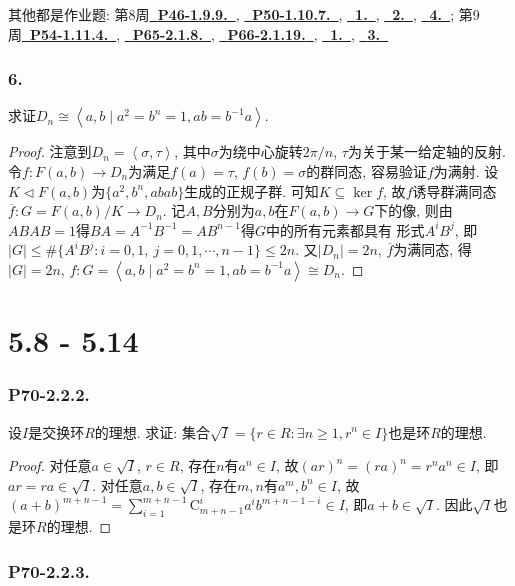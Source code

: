 \documentclass[12pt, a4paper, fontset=windows]{ctexart}
\newcommand{\abs}[1]{\left|{#1}\right|}
\newcommand{\cl}[1]{\overline{#1}} %
\newcommand{\gen}[1]{\left\langle{#1}\right\rangle}
\newcommand{\isom}{\cong} %
\newcommand{\myref}[2][]{\hyperref[#1]{\bf\color{blue}\ {#2}\ }}
\begin{document}
其他都是作业题: 第8周\myref[C-log]{P46-1.9.9.}, 
\myref[gcd-inv]{P50-1.10.7.}, \myref[basis-ext]{1.}, 
\myref[ord-count]{2.}, \myref[5769]{4.}; 
第9周\myref[pq-nonabel]{P54-1.11.4.}, 
\myref[Qsqrt2]{P65-2.1.8.}, 
\myref[nilpotent]{P66-2.1.19.}, 
\myref[auts]{1.}, \myref[2022-cyclic]{3.}

\section*{6.}

求证$D_n\isom\gen{a,b\mid a^2=b^n=1,ab=b^{-1}a}$. 

\begin{proof}
注意到$D_n=\gen{\sigma,\tau}$, 其中$\sigma$为绕中心旋转$2\pi/n$, 
$\tau$为关于某一给定轴的反射. 令$f:F(a,b)\to D_n$为满足$f(a)=\tau$, $f(b)=\sigma$的群同态, 
容易验证$f$为满射. 设$K\lhd F(a,b)$为$\{a^2,b^n,abab\}$生成的正规子群. 
可知$K\subseteq\ker f$, 故$f$诱导群满同态$\cl{f}:G=F(a,b)/K\to D_n$. 
记$A,B$分别为$a,b$在$F(a,b)\to G$下的像, 
则由$ABAB=1$得$BA=A^{-1}B^{-1}=AB^{n-1}$得$G$中的所有元素都具有
形式$A^iB^j$, 即$\abs{G}\le\#\{A^iB^j:i=0,1,\ j=0,1,\cdots,n-1\}\le 2n$. 
又$\abs{D_n}=2n$, $\cl{f}$为满同态, 得$\abs{G}=2n$, 
$f:G=\gen{a,b\mid a^2=b^n=1,ab=b^{-1}a}\isom D_n$. 
\end{proof}

\clearpage
\part{5.8 - 5.14}

\section*{P70-2.2.2.}

设$I$是交换环$R$的理想. 求证: 集合$\sqrt{I}=\{r\in R:\exists n\ge 1,r^n\in I\}$也是环$R$的理想. 

\begin{proof}
对任意$a\in\sqrt{I}$, $r\in R$, 存在$n$有$a^n\in I$, 
故$(ar)^n=(ra)^n=r^na^n\in I$, 即$ar=ra\in\sqrt{I}$. 
对任意$a,b\in\sqrt{I}$, 存在$m,n$有$a^m,b^n\in I$, 
故$(a+b)^{m+n-1}=\sum^{m+n-1}_{i=1}\mathrm{C}^i_{m+n-1}a^ib^{m+n-1-i}\in I$, 
即$a+b\in\sqrt{I}$. 因此$\sqrt{I}$也是环$R$的理想. 
\end{proof}

\section*{P70-2.2.3.}
\end{document}
